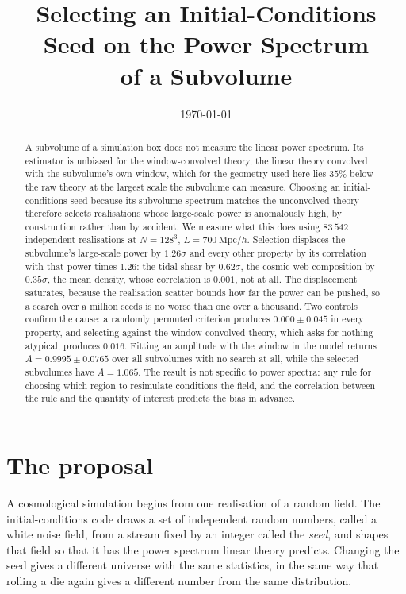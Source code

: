 \documentclass[12pt]{article}
\title{Selecting an Initial-Conditions Seed on the Power Spectrum\\
       of a Subvolume}
\author{}
\date{\today}
\newcommand{\Mpch}{\ \mathrm{Mpc}/h}
\begin{document}
\maketitle

\begin{abstract}
A subvolume of a simulation box does not measure the linear power spectrum. Its
estimator is unbiased for the window-convolved theory, the linear theory
convolved with the subvolume's own window, which for the geometry used here lies
$35\%$ below the raw theory at the largest scale the subvolume can measure.
Choosing an initial-conditions seed because its subvolume spectrum matches
the unconvolved theory therefore selects realisations whose large-scale power is
anomalously high, by construction rather than by accident. We measure what this
does using $83\,542$ independent realisations at $N = 128^3$,
$L = 700\Mpch$. Selection displaces the subvolume's large-scale power by
$1.26\sigma$ and every other property by its correlation with that power times
$1.26$: the tidal shear by $0.62\sigma$, the cosmic-web composition by
$0.35\sigma$, the mean density, whose correlation is $0.001$, not at all. The
displacement saturates, because the realisation scatter bounds how far the power
can be pushed, so a search over a million seeds is no worse than one over a
thousand. Two controls confirm the cause: a randomly permuted criterion produces
$0.000 \pm 0.045$ in every property, and selecting against the window-convolved
theory,
which asks for nothing atypical, produces $0.016$. Fitting an amplitude with the
window in the model returns $A = 0.9995 \pm 0.0765$ over all subvolumes with no
search at all, while the selected subvolumes have $A = 1.065$. The result is not
specific to power spectra: any rule for choosing which region to resimulate
conditions the field, and the correlation between the rule and the quantity of
interest predicts the bias in advance.
\end{abstract}

\section{The proposal}
\label{sec:proposal}

A cosmological simulation begins from one realisation of a random field. The
initial-conditions code draws a set of independent random numbers, called a
white noise field, from a stream fixed by an integer called the \emph{seed}, and
shapes that field so that it has the power spectrum linear theory predicts.
Changing the seed gives a different universe with the same statistics, in the
same way that rolling a die again gives a different number from the same
distribution.
\end{document}
